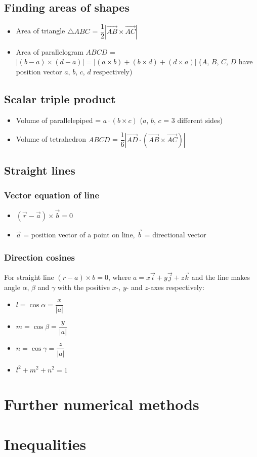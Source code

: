 \documentclass[11pt, A4paper]{article}
\begin{document}
	\subsection{Finding areas of shapes}
	\begin{itemize}
		\item Area of triangle $\bigtriangleup ABC$ = $\dfrac{1}{2}|\overrightarrow{AB}\times\overrightarrow{AC}|$
		\item Area of parallelogram $ABCD$ = $|(b-a) \times (d-a)|=|(a\times b)+(b \times d) + (d \times a)|$ ($A$, $B$, $C$, $D$ have position vector $a$, $b$, $c$, $d$ respectively)
	\end{itemize}
	\subsection{Scalar triple product}
	\begin{itemize}
		\item Volume of parallelepiped = $a\cdot(b\times c)$ ($a$, $b$, $c$ = 3 different sides)
		\item Volume of tetrahedron $ABCD$ = $\dfrac{1}{6}|\overrightarrow{AD}\cdot(\overrightarrow{AB}\times\overrightarrow{AC})|$
	\end{itemize}
	\subsection{Straight lines}
	\subsubsection{Vector equation of line}
	\begin{itemize}
		\item $(\vec{r}-\vec{a})\times\vec{b}=0$
		\item $\vec{a}$ = position vector of a point on line, $\vec{b}$ = directional vector
	\end{itemize}
	\subsubsection{Direction cosines}
	For straight line $(r-a)\times b=0$, where $a=x\vec{i}+y\vec{j}+z\vec{k}$ and the line makes angle $\alpha$, $\beta$ and $\gamma$ with the positive $x$-, $y$- and $z$-axes respectively:
	\begin{itemize}
		\item $l=\cos\alpha = \dfrac{x}{|a|}$
		\item $m=\cos\beta = \dfrac{y}{|a|}$
		\item $n=\cos\gamma = \dfrac{z}{|a|}$
		\item $l^2+m^2+n^2=1$
	\end{itemize}
	
	\section{Further numerical methods}
	\section{Inequalities}
\end{document}
